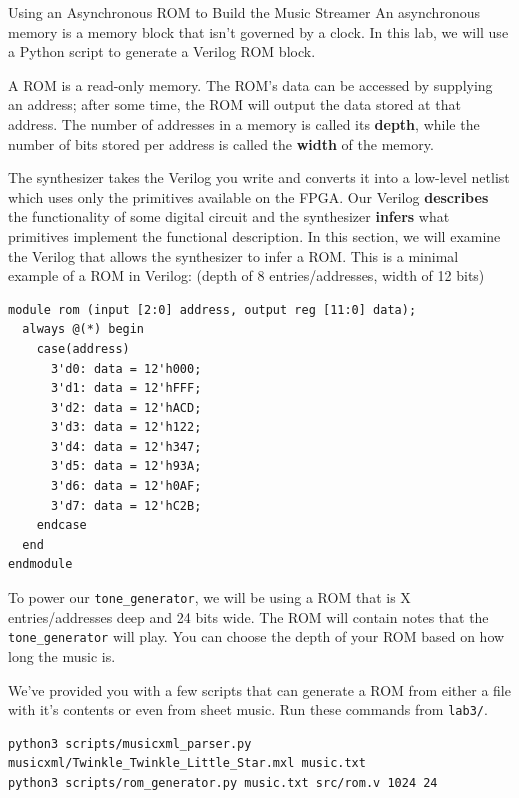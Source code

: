 \documentclass[11pt]{article}
\makeatletter
\renewcommand{\section}
{\@startsection {section}{1}{0pt}
 {-2ex}
 {1ex}
 {\bfseries\Large}}
\makeatother
\begin{document}
\section{Using an Asynchronous ROM to Build the Music Streamer}
An asynchronous memory is a memory block that isn't governed by a clock.
In this lab, we will use a Python script to generate a Verilog ROM block.

A ROM is a read-only memory.
The ROM's data can be accessed by supplying an address; after some time, the ROM will output the data stored at that address.
The number of addresses in a memory is called its \textbf{depth}, while the number of bits stored per address is called the \textbf{width} of the memory.

The synthesizer takes the Verilog you write and converts it into a low-level netlist which uses only the primitives available on the FPGA.
Our Verilog \textbf{describes} the functionality of some digital circuit and the synthesizer \textbf{infers} what primitives implement the functional description.
In this section, we will examine the Verilog that allows the synthesizer to infer a ROM.
This is a minimal example of a ROM in Verilog: (depth of 8 entries/addresses, width of 12 bits)

\begin{verbatim}
module rom (input [2:0] address, output reg [11:0] data);
  always @(*) begin
    case(address)
      3'd0: data = 12'h000;
      3'd1: data = 12'hFFF;
      3'd2: data = 12'hACD;
      3'd3: data = 12'h122;
      3'd4: data = 12'h347;
      3'd5: data = 12'h93A;
      3'd6: data = 12'h0AF;
      3'd7: data = 12'hC2B;
    endcase
  end
endmodule
\end{verbatim}

To power our \verb|tone_generator|, we will be using a ROM that is X entries/addresses deep and 24 bits wide.
The ROM will contain notes that the \verb|tone_generator| will play.
You can choose the depth of your ROM based on how long the music is.

We've provided you with a few scripts that can generate a ROM from either a file with it's contents or even from sheet music.
Run these commands from \verb|lab3/|.

\begin{verbatim}
python3 scripts/musicxml_parser.py musicxml/Twinkle_Twinkle_Little_Star.mxl music.txt
python3 scripts/rom_generator.py music.txt src/rom.v 1024 24
\end{verbatim}
\end{document}
